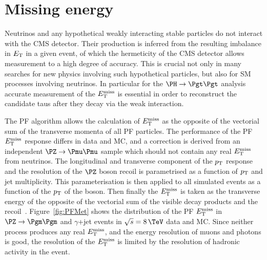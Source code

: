 \section{Missing energy}
\label{sec:met}

Neutrinos and any hypothetical weakly interacting stable particles do not
interact with the CMS detector. Their production is inferred from the resulting
imbalance in $E_{\mathrm{T}}$ in a given event, of which the hermeticity of the CMS detector
allows measurement to a high degree of accuracy. This is crucial not only in
many searches for new physics involving such hypothetical particles, but also for
\ac{SM} processes involving neutrinos. In particular for the $\PH \to \Pgt\Pgt$
analysis accurate measurement of the $E_{\mathrm{T}}^{\text{miss}}$ is essential in order to reconstruct the
candidate taus after they decay via the weak interaction.

The \ac{PF} algorithm allows the calculation of $E_{\mathrm{T}}^{\text{miss}}$ as the opposite of the vectorial sum
of the transverse momenta of all \ac{PF} particles. 
The performance of the \ac{PF} $E_{\mathrm{T}}^{\text{miss}}$ response differs in data and
\ac{MC}, and a correction is derived from an independent $\PZ\to\Pmu\Pmu$ sample which
should not contain any real $E_{\mathrm{T}}^{\text{miss}}$ from neutrinos. The longitudinal and transverse component of
the $p_{\mathrm{T}}$ response and the resolution of the $\PZ$ boson recoil is parametrised
as a function of $p_{\mathrm{T}}$ and jet multiplicity. This parameterisation is then
applied to all simulated events as a function of the $p_{\mathrm{T}}$ of the boson. Then
finally the $E_{\mathrm{T}}^{\text{miss}}$ is taken as the transverse energy of the opposite of the 
vectorial sum of the visible decay products and the
recoil~\cite{CMS-PAS-JME-12-002}. Figure~\ref{fig:PFMet} shows the distribution
of the \ac{PF} $E_{\mathrm{T}}^{\text{miss}}$ in $\PZ\to\Pgm\Pgm$ and $\gamma$+jet events in
$\sqrt{s}=8\,\TeV$ data and \ac{MC}. Since neither process produces any
real $E_{\mathrm{T}}^{\text{miss}}$, and the energy resolution of muons and photons is good, the
resolution of the $E_{\mathrm{T}}^{\text{miss}}$ is limited by the resolution of hadronic activity in
the event.  

